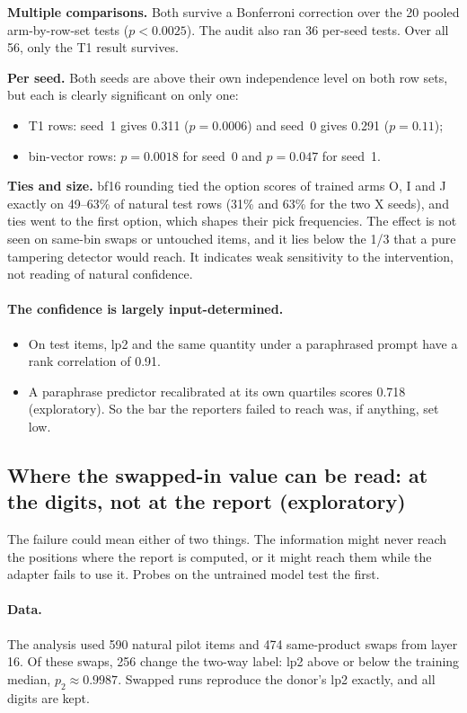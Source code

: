 \documentclass[11pt]{article}
\begin{document}
\textbf{Multiple comparisons.} Both survive a Bonferroni correction over the 20 pooled arm-by-row-set tests ($p < 0.0025$). The audit also ran 36 per-seed tests. Over all 56, only the T1 result survives.

\textbf{Per seed.} Both seeds are above their own independence level on both row sets, but each is clearly significant on only one:
\begin{itemize}
\item T1 rows: seed~1 gives 0.311 ($p = 0.0006$) and seed~0 gives 0.291 ($p = 0.11$);
\item bin-vector rows: $p = 0.0018$ for seed~0 and $p = 0.047$ for seed~1.
\end{itemize}

\textbf{Ties and size.} bf16 rounding tied the option scores of trained arms O, I and J exactly on 49--63\% of natural test rows (31\% and 63\% for the two X seeds), and ties went to the first option, which shapes their pick frequencies. The effect is not seen on same-bin swaps or untouched items, and it lies below the 1/3 that a pure tampering detector would reach. It indicates weak sensitivity to the intervention, not reading of natural confidence.

\paragraph{The confidence is largely input-determined.}
\begin{itemize}
\item On test items, lp2 and the same quantity under a paraphrased prompt have a rank correlation of 0.91.
\item A paraphrase predictor recalibrated at its own quartiles scores 0.718 (exploratory). So the bar the reporters failed to reach was, if anything, set low.
\end{itemize}

\subsection{Where the swapped-in value can be read: at the digits, not at the report (exploratory)}

The failure could mean either of two things. The information might never reach the positions where the report is computed, or it might reach them while the adapter fails to use it. Probes on the untrained model test the first.

\paragraph{Data.} The analysis used 590 natural pilot items and 474 same-product swaps from layer 16. Of these swaps, 256 change the two-way label: lp2 above or below the training median, $p_2 \approx 0.9987$. Swapped runs reproduce the donor's lp2 exactly, and all digits are kept.
\end{document}
